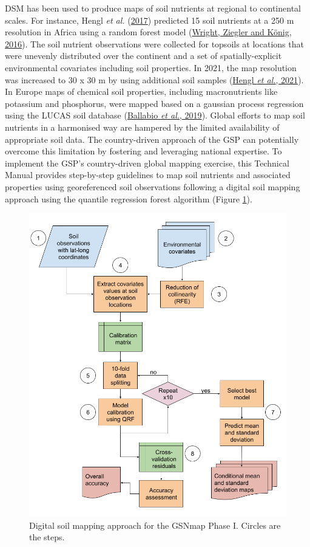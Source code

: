 \documentclass[
  10pt,
  b5paper,
  oneside]{book}
\begin{document}
DSM has been used to produce maps of soil nutrients at regional to continental scales. For instance, Hengl \emph{et al.} (\protect\hyperlink{ref-Hengl2017}{2017}) predicted 15 soil nutrients at a 250 m resolution in Africa using a random forest model (\protect\hyperlink{ref-wright2016}{Wright, Ziegler and König, 2016}). The soil nutrient observations were collected for topsoils at locations that were unevenly distributed over the continent and a set of spatially-explicit environmental covariates including soil properties. In 2021, the map resolution was increased to 30 x 30 m by using additional soil samples (\protect\hyperlink{ref-hengl2021}{Hengl \emph{et al.}, 2021}).
In Europe maps of chemical soil properties, including macronutrients like potassium and phosphorus, were mapped based on a gaussian process regression using the LUCAS soil database (\protect\hyperlink{ref-ballabio2019}{Ballabio \emph{et al.}, 2019}).
Global efforts to map soil nutrients in a harmonised way are hampered by the limited availability of appropriate soil data. The country-driven approach of the GSP can potentially overcome this limitation by fostering and leveraging national expertise. To implement the GSP's country-driven global mapping exercise, this Technical Manual provides step-by-step guidelines to map soil nutrients and associated properties using georeferenced soil observations following a digital soil mapping approach using the quantile regression forest algorithm (Figure \ref{fig:workflow1}).

\begin{figure}
\includegraphics[width=1\linewidth]{images/workflow_lat_long_data} \caption{Digital soil mapping approach for the GSNmap Phase I. Circles are the steps.}\label{fig:workflow1}
\end{figure}
\end{document}

